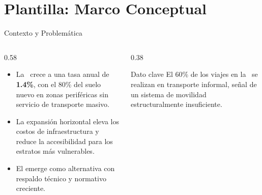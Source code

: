 
\section{Plantilla: Marco Conceptual}


\begin{frame}{Contexto y Problemática}
  \begin{columns}[T]
    \begin{column}{0.58\textwidth}
      \begin{itemize}
        \item La \zmvm\ crece a una tasa anual de \textbf{1.4\%}, con el 80\% del suelo
              nuevo en zonas periféricas sin servicio de transporte masivo.
        \item La expansión horizontal eleva los \alert{costos de infraestructura}
              y reduce la accesibilidad para los estratos más vulnerables.
        \item El  emerge como alternativa
              con respaldo técnico y normativo creciente.
      \end{itemize}
    \end{column}
    \begin{column}{0.38\textwidth}
      \begin{block}{Dato clave}
        El 60\% de los viajes en la \zmvm\ se realizan en transporte informal,
        señal de un sistema de movilidad estructuralmente insuficiente.
      \end{block}
    \end{column}
  \end{columns}
\end{frame}


